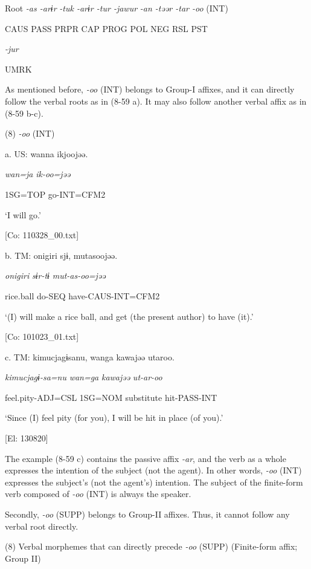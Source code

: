   Root  \textit{{}-as  {}-arɨr} %
\textit{{}-tuk  {}-arɨr  {}-tur  {}-jawur} %
\textit{{}-an  {}-təər  {}-tar  {}-oo} (INT)

    CAUS  PASS  PRPR  CAP  PROG  POL  NEG  RSL  PST  

          \textit{{}-jur} 

          UMRK    

As mentioned before, \textit{{}-oo} (INT) belongs to Group-I affixes, and it can directly follow the verbal roots as in (8-59 a). It may also follow another verbal affix as in (8-59 b-c).

(8)  \textit{{}-oo} (INT)

  a.  US:  wanna  ikjoojəə.

      \textit{wan=ja}  \textit{ik-oo=jəə}

      1SG=TOP  go-INT=CFM2

      ‘I will go.’

      [Co: 110328\_00.txt]

  b.  TM:  {\textbar}onigiri{\textbar}  sjɨ,  mutasoojəə.

      \textit{onigiri}  \textit{sɨr-tɨ}  \textit{mut-as-oo=jəə}

      rice.ball  do-SEQ  have-CAUS-INT=CFM2

      ‘(I) will make a rice ball, and get (the present author) to have (it).’

      [Co: 101023\_01.txt]

  c.  TM:  kimucjagɨsanu,  wanga  kawajəə  utaroo.

      \textit{kimucjagɨ-sa=nu}  \textit{wan=ga}  \textit{kawajəə}  \textit{ut-ar-oo}

      feel.pity-ADJ=CSL  1SG=NOM  substitute  hit-PASS-INT

      ‘Since (I) feel pity (for you), I will be hit in place (of you).’

      [El: 130820]

The example (8-59 c) contains the passive affix \textit{{}-ar}, and the verb as a whole expresses the intention of the subject (not the agent). In other words, \textit{{}-oo} (INT) expresses the subject’s (not the agent’s) intention. The subject of the finite-form verb composed of \textit{{}-oo} (INT) is always the speaker.

  Secondly, \textit{{}-oo} (SUPP) belongs to Group-II affixes. Thus, it cannot follow any verbal root directly.

(8)  Verbal morphemes that can directly precede \textit{-oo} (SUPP) (Finite-form affix; Group II)

